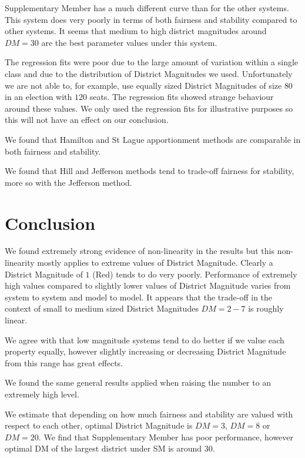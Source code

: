 \documentclass{article}
\begin{document}

Supplementary Member has a much different curve than for the other systems. This system does very poorly in terms of both fairness and stability compared to other systems. It seems that medium to high district magnitudes around $DM=30$ are the best parameter values under this system.

The regression fits were poor due to the large amount of variation within a single class and due to the distribution of District Magnitudes we used. Unfortunately we are not able to, for example, use equally sized District Magnitudes of size $80$ in an election with $120$ seats. The regression fits showed strange behaviour around these values. We only used the regression fits for illustrative purposes so this will not have an effect on our conclusion.


We found that Hamilton and St Lague apportionment methods are comparable in both fairness and stability.

We found that Hill and Jefferson methods tend to trade-off fairness for stability, more so with the Jefferson method.

\newpage
\section{Conclusion}

We found extremely strong evidence of non-linearity in the results but this non-linearity mostly applies to extreme values of District Magnitude. Clearly a District Magnitude of $1$ (Red) tends to do very poorly. Performance of extremely high values compared to slightly lower values of District Magnitude varies from system to system and model to model. It appears that the trade-off in the context of small to medium sized District Magnitudes $DM=2-7$ is roughly linear.

We agree with \cite{sweetspot} that low magnitude systems tend to do better if we value each property equally, however slightly increasing or decreasing District Magnitude from this range has great effects.

We found the same general results applied when raising the number to an extremely high level.

We estimate that depending on how much fairness and stability are valued with respect to each other, optimal District Magnitude is $DM=3$, $DM=8$ or $DM=20$. We find that Supplementary Member has poor performance, however optimal DM of the largest district under SM is around $30$.
\end{document}

